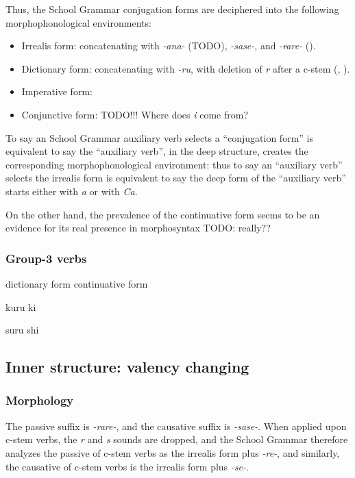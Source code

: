 \documentclass[UTF8, a4paper, oneside, scheme=plain]{ctexart}
\newcommand{\corpus}[1]{\emph{#1}}
\begin{document}
Thus, the School Grammar conjugation forms are deciphered 
into the following morphophonological environments:
\begin{itemize}
    \item Irrealis form: concatenating with \corpus{-ana-} (TODO), 
    \corpus{-sase-}, and \corpus{-rare-} (). 
    \item Dictionary form: concatenating with \corpus{-ru},
    with deletion of \corpus{r} after a c-stem (, ).
    \item Imperative form:
    \item Conjunctive form: TODO!!! Where does \corpus{i} come from?
\end{itemize}
To say an School Grammar auxiliary verb selects a ``conjugation form''
is equivalent to say the ``auxiliary verb'', in the deep structure,
creates the corresponding morphophonological environment:
thus to say an ``auxiliary verb'' selects the irrealis form 
is equivalent to say the deep form of the ``auxiliary verb'' 
starts either with \corpus{a} or with \corpus{Ca}.

On the other hand, the prevalence of the continuative form seems to be an evidence 
for its real presence in morphosyntax TODO: really??

\subsubsection{Group-3 verbs}

dictionary form continuative form 

kuru ki 

suru shi

\subsection{Inner structure: valency changing}\label{sec:valency-changing}

\subsubsection{Morphology}\label{sec:valency-changing-form}

The passive suffix is \corpus{-rare-},
and the causative suffix is \corpus{-sase-}.
When applied upon c-stem verbs,
the \corpus{r} and \corpus{s} sounds are dropped,
and the School Grammar therefore analyzes 
the passive of c-stem verbs as the irrealis form plus \corpus{-re-},
and similarly,
the causative of c-stem verbs is the irrealis form plus \corpus{-se-}.
\end{document}
